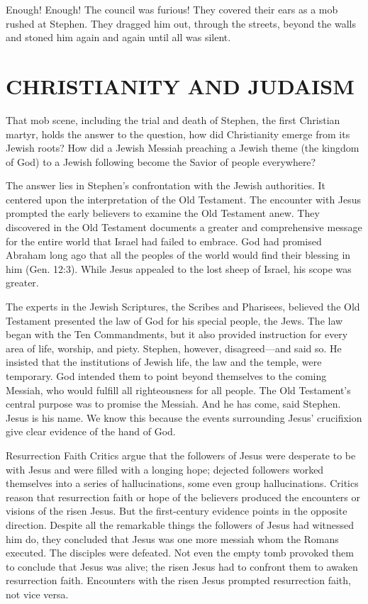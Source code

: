 Enough! Enough! The council was furious! They covered their ears as a mob rushed at Stephen. They
dragged him out, through the streets, beyond the walls and stoned him again and again until all was
silent.

\section{CHRISTIANITY AND JUDAISM}

That mob scene, including the trial and death of Stephen, the first Christian martyr, holds the
answer to the question, how did Christianity emerge from its Jewish roots? How did a Jewish Messiah
preaching a Jewish theme (the kingdom of God) to a Jewish following become the Savior of people
everywhere?

The answer lies in Stephen’s confrontation with the Jewish authorities. It centered upon the
interpretation of the Old Testament. The encounter with Jesus prompted the early believers to
examine the Old Testament anew. They discovered in the Old Testament documents a greater and
comprehensive message for the entire world that Israel had failed to embrace. God had promised
Abraham long ago that all the peoples of the world would find their blessing in him (Gen. 12:3).
While Jesus appealed to the lost sheep of Israel, his scope was greater.

The experts in the Jewish Scriptures, the Scribes and Pharisees, believed the Old Testament
presented the law of God for his special people, the Jews. The law began with the Ten Commandments,
but it also provided instruction for every area of life, worship, and piety. Stephen, however,
disagreed—and said so. He insisted that the institutions of Jewish life, the law and the temple,
were temporary. God intended them to point beyond themselves to the coming Messiah, who would
fulfill all righteousness for all people. The Old Testament’s central purpose was to promise the
Messiah. And he has come, said Stephen. Jesus is his name. We know this because the events
surrounding Jesus’ crucifixion give clear evidence of the hand of God.

\begin{sidebar}{Resurrection Faith}
Critics argue that the followers of Jesus were desperate to be with Jesus and were filled with a
longing hope; dejected followers worked themselves into a series of hallucinations, some even group
hallucinations. Critics reason that resurrection faith or hope of the believers produced the
encounters or visions of the risen Jesus. But the first-century evidence points in the opposite
direction. Despite all the remarkable things the followers of Jesus had witnessed him do, they
concluded that Jesus was one more messiah whom the Romans executed. The disciples were defeated. Not
even the empty tomb provoked them to conclude that Jesus was alive; the risen Jesus had to confront
them to awaken resurrection faith. Encounters with the risen Jesus prompted resurrection faith, not
vice versa.
\end{sidebar}


